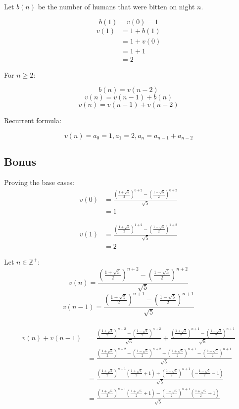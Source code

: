 \documentclass[11pt]{article}
\begin{document}
Let \(b(n)\) be the number of humans that were bitten on night \(n\).

\[b(1) = v(0) = 1\]
\begin{align*}
v(1) &= 1 + b(1) \\
&= 1 + v(0) \\
&= 1 + 1 \\
&= 2
\end{align*}

For \(n \ge 2\):

\[b(n) = v(n - 2)\]
\[v(n) = v(n - 1) + b(n)\]
\[v(n) = v(n - 1) + v(n - 2)\]

Recurrent formula:

\[v(n) = a_0 = 1, a_1 = 2, a_n = a_{n - 1} + a_{n - 2}\]

\subsection{Bonus}
\label{sec:org710ab2b}

Proving the base cases:
\\[0pt]

\begin{align*}
v(0) &= \frac{(\frac{1 + \sqrt{5}}{2})^{0+2} - (\frac{1 - \sqrt{5}}{2})^{0+2}}{\sqrt{5}} \\
&= 1
\end{align*}

\begin{align*}
v(1) &= \frac{(\frac{1 + \sqrt{5}}{2})^{1+2} - (\frac{1 - \sqrt{5}}{2})^{1+2}}{\sqrt{5}} \\
&= 2
\end{align*}

Let \(n \in \mathbb{Z}^+\):
\\[0pt]

\[v(n) = \frac{(\frac{1 + \sqrt{5}}{2})^{n+2} - (\frac{1 - \sqrt{5}}{2})^{n+2}}{\sqrt{5}}\]
\[v(n - 1) = \frac{(\frac{1 + \sqrt{5}}{2})^{n+1} - (\frac{1 - \sqrt{5}}{2})^{n+1}}{\sqrt{5}}\]
\\[0pt]

\begin{align*}
v(n) + v(n - 1) &= \frac{(\frac{1 + \sqrt{5}}{2})^{n+2} - (\frac{1 - \sqrt{5}}{2})^{n+2}}{\sqrt{5}} + \frac{(\frac{1 + \sqrt{5}}{2})^{n+1} - (\frac{1 - \sqrt{5}}{2})^{n+1}}{\sqrt{5}} \\
&= \frac{(\frac{1 + \sqrt{5}}{2})^{n+2} - (\frac{1 - \sqrt{5}}{2})^{n+2} + (\frac{1 + \sqrt{5}}{2})^{n+1} - (\frac{1 - \sqrt{5}}{2})^{n+1}}{\sqrt{5}} \\
&= \frac{(\frac{1 + \sqrt{5}}{2})^{n+1}(\frac{1 + \sqrt{5}}{2} + 1) + (\frac{1 - \sqrt{5}}{2})^{n+1}(-\frac{1 - \sqrt{5}}{2} - 1)}{\sqrt{5}} \\
&= \frac{(\frac{1 + \sqrt{5}}{2})^{n+1}(\frac{1 + \sqrt{5}}{2} + 1) - (\frac{1 - \sqrt{5}}{2})^{n+1}(\frac{1 + \sqrt{5}}{2} + 1)}{\sqrt{5}}
\end{align*}
\end{document}
